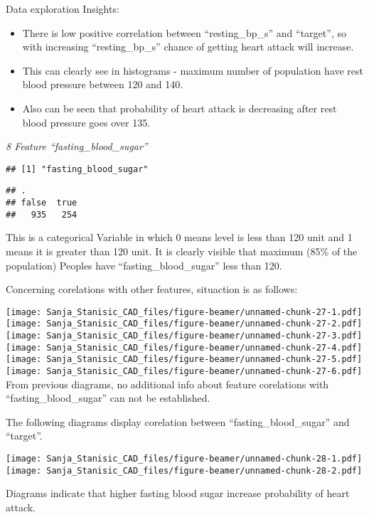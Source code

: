 \documentclass[
  ignorenonframetext,
]{beamer}
\begin{document}
\begin{frame}[fragile]{Data exploration}
Insights:

\begin{itemize}
\item
  There is low positive correlation between ``resting\_bp\_s'' and
  ``target'', so with increasing ``resting\_bp\_s'' chance of getting
  heart attack will increase.
\item
  This can clearly see in histograms - maximum number of population have
  rest blood pressure between 120 and 140.
\item
  Also can be seen that probability of heart attack is decreasing after
  rest blood pressure goes over 135.
\end{itemize}

\emph{8 Feature ``fasting\_blood\_sugar''}

\begin{verbatim}
## [1] "fasting_blood_sugar"
\end{verbatim}

\begin{verbatim}
## .
## false  true 
##   935   254
\end{verbatim}

This is a categorical Variable in which 0 means level is less than 120
unit and 1 means it is greater than 120 unit. It is clearly visible that
maximum (85\% of the population) Peoples have ``fasting\_blood\_sugar''
less than 120.

Concerning corelations with other features, situaction is as follows:

\texttt{[image: Sanja\_Stanisic\_CAD\_files/figure-beamer/unnamed-chunk-27-1.pdf]}
\texttt{[image: Sanja\_Stanisic\_CAD\_files/figure-beamer/unnamed-chunk-27-2.pdf]}
\texttt{[image: Sanja\_Stanisic\_CAD\_files/figure-beamer/unnamed-chunk-27-3.pdf]}
\texttt{[image: Sanja\_Stanisic\_CAD\_files/figure-beamer/unnamed-chunk-27-4.pdf]}
\texttt{[image: Sanja\_Stanisic\_CAD\_files/figure-beamer/unnamed-chunk-27-5.pdf]}
\texttt{[image: Sanja\_Stanisic\_CAD\_files/figure-beamer/unnamed-chunk-27-6.pdf]}
From previous diagrams, no additional info about feature corelations
with ``fasting\_blood\_sugar'' can not be established.

The following diagrams display corelation between
``fasting\_blood\_sugar'' and ``target''.

\texttt{[image: Sanja\_Stanisic\_CAD\_files/figure-beamer/unnamed-chunk-28-1.pdf]}
\texttt{[image: Sanja\_Stanisic\_CAD\_files/figure-beamer/unnamed-chunk-28-2.pdf]}

Diagrams indicate that higher fasting blood sugar increase probability
of heart attack.


\end{frame}
\end{document}
